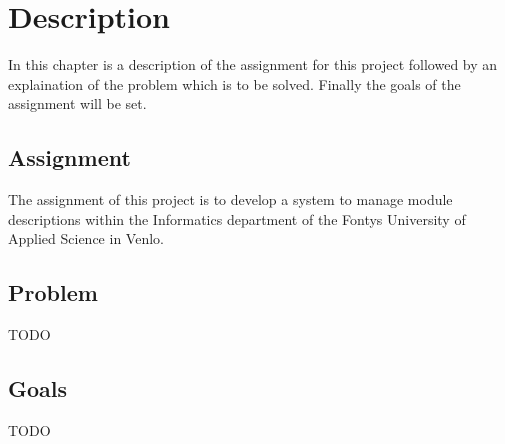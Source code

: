 \chapter{Description}
In this chapter is a description of the assignment for this project followed by an explaination 
of the problem which is to be solved. Finally the goals of the assignment will be set.

\section{Assignment}
The assignment of this project is to develop a system to manage module descriptions within the Informatics
department of the Fontys University of Applied Science in Venlo. 

\section{Problem}
TODO

\section{Goals}
TODO